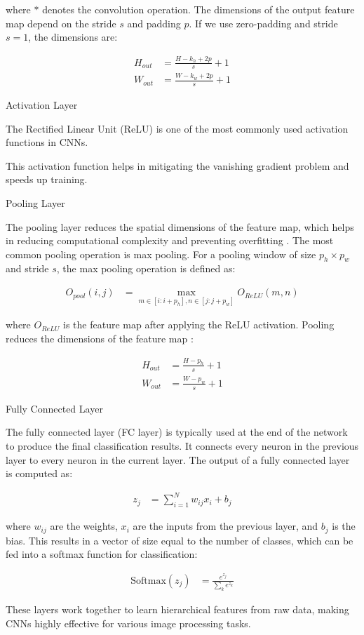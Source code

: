 where \( * \) denotes the convolution operation.
The dimensions of the output feature map depend on the stride \( s \) and padding \( p \).
If we use zero-padding and stride \( s = 1 \), the dimensions are:

\begin{align}
  H_{out} &= \frac{H - k_h + 2p}{s} + 1 \\
  W_{out} &= \frac{W - k_w + 2p}{s} + 1
\end{align}

Activation Layer 

The Rectified Linear Unit (ReLU) is one of the most commonly used activation functions in CNNs.

This activation function helps in mitigating the vanishing gradient problem and speeds up training.

Pooling Layer

The pooling layer reduces the spatial dimensions of the feature map, which helps in reducing computational complexity and preventing overfitting \cite{Yamaguchi_Sakamoto_Akabane_Fujimoto_1990}.
The most common pooling operation is max pooling.
For a pooling window of size \( p_h \times p_w \) and stride \( s \), the max pooling operation is defined as:

\begin{align}
  O_{pool}(i, j) &= \max_{m \in [i:i+p_h], n \in [j:j+p_w]} O_{ReLU}(m, n)
\end{align}

where \( O_{ReLU} \) is the feature map after applying the ReLU activation.
Pooling reduces the dimensions of the feature map \cite{Ciresan_Meier_Schmidhuber_2012}:

\begin{align}
  H_{out} &= \frac{H - p_h}{s} + 1 \\
  W_{out} &= \frac{W - p_w}{s} + 1
\end{align}

Fully Connected Layer

The fully connected layer (FC layer) is typically used at the end of the network to produce the final classification results.
It connects every neuron in the previous layer to every neuron in the current layer.
The output of a fully connected layer is computed as:

\begin{align}
  z_j &= \sum_{i=1}^{N} w_{ij} x_i + b_j
\end{align}

where \( w_{ij} \) are the weights, \( x_i \) are the inputs from the previous layer, and \( b_j \) is the bias.
This results in a vector of size equal to the number of classes, which can be fed into a softmax function for classification:

\begin{align}
  \text{Softmax}(z_j) &= \frac{e^{z_j}}{\sum_{k} e^{z_k}}
\end{align}

These layers work together to learn hierarchical features from raw data, making CNNs highly effective for various image processing tasks.

